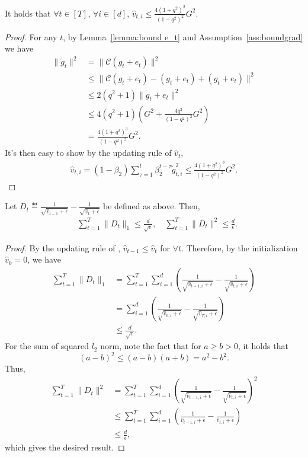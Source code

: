\documentclass[11pt]{article}
\begin{document}
\begin{Lemma} \label{lemma:bound v_t}
It holds that $\forall t\in [T]$, $\forall i\in [d]$, $\hat v_{t,i}\leq \frac{4(1+q^2)^3}{(1-q^2)^2}G^2$.

\end{Lemma}

\begin{proof}
For any $t$, by Lemma~\ref{lemma:bound e_t} and Assumption~\ref{ass:boundgrad} we have
\begin{align*}
    \|\tilde g_t\|^2&=\|\mathcal C(g_t+e_t)\|^2\\
    &\leq \|\mathcal C(g_t+e_t)-(g_t+e_t)+(g_t+e_t)\|^2\\
    &\leq 2(q^2+1)\|g_t+e_t\|^2\\
    &\leq 4(q^2+1)(G^2+\frac{4q^2}{(1-q^2)^2}G^2)\\
    &=\frac{4(1+q^2)^3}{(1-q^2)^2}G^2.
\end{align*}
It's then easy to show by the updating rule of $\hat v_t$,
\begin{align*}
    \hat v_{t,i}=(1-\beta_2)\sum_{\tau=1}^t \beta_2^{t-\tau} \tilde g_{t,i}^2\leq \frac{4(1+q^2)^3}{(1-q^2)^2}G^2.
\end{align*}

\end{proof}


\begin{Lemma}  \label{lemma:bound difference}
Let $D_t\eqdef \frac{1}{\sqrt{\hat v_{t-1}+\epsilon}}-\frac{1}{\sqrt{\hat v_t+\epsilon}}$ be defined as above. Then,
\begin{align*}
    &\sum_{t=1}^T \|D_t\|_1 \leq \frac{d}{\sqrt\epsilon},\quad  \sum_{t=1}^T \|D_t\|^2 \leq \frac{d}{\epsilon}.
\end{align*}
\end{Lemma}

\begin{proof}
By the updating rule of \algo, $\hat v_{t-1}\leq \hat v_t$ for $\forall t$. Therefore, by the initialization $\hat v_0=0$, we have
\begin{align*}
    \sum_{t=1}^T \|D_t\|_1 &=\sum_{t=1}^T \sum_{i=1}^d (\frac{1}{\sqrt{\hat v_{t-1,i}+\epsilon}}-\frac{1}{\sqrt{\hat v_{t,i}+\epsilon}})\\
    &=\sum_{i=1}^d (\frac{1}{\sqrt{\hat v_{0,i}+\epsilon}}-\frac{1}{\sqrt{\hat v_{T,i}+\epsilon}})\\
    &\leq \frac{d}{\sqrt\epsilon}.
\end{align*}
For the sum of squared $l_2$ norm, note the fact that for $a\geq b>0$, it holds that
\begin{equation*}
    (a-b)^2\leq (a-b)(a+b)=a^2-b^2.
\end{equation*}
Thus,
\begin{align*}
    \sum_{t=1}^T \|D_t\|^2&=\sum_{t=1}^T \sum_{i=1}^d (\frac{1}{\sqrt{\hat v_{t-1,i}+\epsilon}}-\frac{1}{\sqrt{\hat v_{t,i}+\epsilon}})^2\\
    &\leq \sum_{t=1}^T \sum_{i=1}^d (\frac{1}{\hat v_{t-1,i}+\epsilon}-\frac{1}{\hat v_{t,i}+\epsilon})\\
    &\leq \frac{d}{\epsilon},
\end{align*}
which gives the desired result.
\end{proof}
\end{document}
